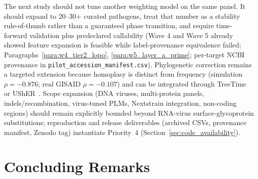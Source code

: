 The next study should not tune another weighting model on the same panel. It should expand to 20--30+ curated pathogens, treat that number as a stability rule-of-thumb rather than a guaranteed phase transition, and require time-forward validation plus predeclared callability (Wave 4 and Wave 5 already showed feature expansion is feasible while label-provenance equivalence failed; Paragraphs~\ref{para:w4_tier2_lopo}, \ref{para:w5_layer_a_prime}; per-target NCBI provenance in \texttt{pilot\_accession\_manifest.csv}). Phylogenetic correction remains a targeted extension because homoplasy is distinct from frequency (simulation $\rho=-0.876$; real GISAID $\rho=-0.107$) and can be integrated through TreeTime~\cite{sagulenko2018treetime} or UShER~\cite{turakhia2020ultrafast}. Scope expansion (DNA viruses, multi-protein panels, indels/recombination, virus-tuned PLMs, Nextstrain integration, non-coding regions) should remain explicitly bounded beyond RNA-virus surface-glycoprotein substitutions; reproduction and release deliverables (archived CSVs, provenance manifest, Zenodo tag) instantiate Priority~4 (Section~\ref{sec:code_availability}).

\section{Concluding Remarks}
\label{sec:final_conclusion}

